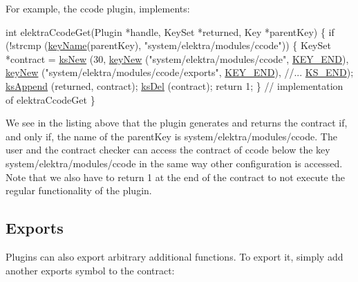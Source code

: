 For example, the ccode plugin, implements\+:


\begin{DoxyCode}
\textcolor{keywordtype}{int} elektraCcodeGet(Plugin *handle, KeySet *returned, Key *parentKey)
\{
        \textcolor{keywordflow}{if} (!strcmp (\hyperlink{group__keyname_ga8e805c726a60da921d3736cda7813513}{keyName}(parentKey), \textcolor{stringliteral}{"system/elektra/modules/ccode"}))
        \{
                KeySet *contract = \hyperlink{group__keyset_ga671e1aaee3ae9dc13b4834a4ddbd2c3c}{ksNew} (30,
                        \hyperlink{group__key_gad23c65b44bf48d773759e1f9a4d43b89}{keyNew} (\textcolor{stringliteral}{"system/elektra/modules/ccode"},
                                \hyperlink{group__key_gga91fb3178848bd682000958089abbaf40aa8adb6fcb92dec58fb19410eacfdd403}{KEY\_END}),
                        \hyperlink{group__key_gad23c65b44bf48d773759e1f9a4d43b89}{keyNew} (\textcolor{stringliteral}{"system/elektra/modules/ccode/exports"},
                                \hyperlink{group__key_gga91fb3178848bd682000958089abbaf40aa8adb6fcb92dec58fb19410eacfdd403}{KEY\_END}),
                        \textcolor{comment}{//...}
                        \hyperlink{kdbenum_8c_a7a28fce3773b2c873c94ac80b8b4cd54}{KS\_END});
                \hyperlink{group__keyset_ga21eb9c3a14a604ee3a8bdc779232e7b7}{ksAppend} (returned, contract);
                \hyperlink{group__keyset_ga27e5c16473b02a422238c8d970db7ac8}{ksDel} (contract);
                \textcolor{keywordflow}{return} 1;
        \}
        \textcolor{comment}{// implementation of elektraCcodeGet}
\}
\end{DoxyCode}


We see in the listing above that the plugin generates and returns the contract if, and only if, the name of the {\ttfamily parent\+Key} is {\ttfamily system/elektra/modules/ccode}. The user and the contract checker can access the contract of ccode below the key {\ttfamily system/elektra/modules/ccode} in the same way other configuration is accessed. Note that we also have to {\ttfamily return 1} at the end of the contract to not execute the regular functionality of the plugin.

\subsection*{Exports}

Plugins can also export arbitrary additional functions. To export it, simply add another {\ttfamily exports} symbol to the contract\+:


